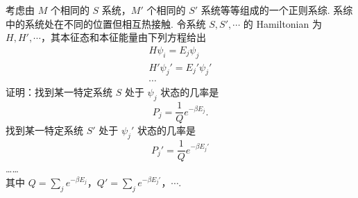 \documentclass{assignment}
\begin{document}
\begin{prob}
    考虑由 $M$ 个相同的 $S$ 系统，$M'$ 个相同的 $S'$ 系统等等组成的一个正则系综. 系综中的系统处在不同的位置但相互热接触. 令系统 $S,S',\cdots$ 的 Hamiltonian 为 $H,H',\cdots$，其本征态和本征能量由下列方程给出
    \begin{gather*}
        H\psi_i=E_j\psi_j\\
        H'\psi_j'=E_j'\psi_j'\\
        \cdots
    \end{gather*}
    证明：找到某一特定系统 $S$ 处于 $\psi_j$ 状态的几率是
    \[
        P_j=\frac{1}{Q}e^{-\beta E_j}.
    \]
    找到某一特定系统 $S'$ 处于 $\psi_j'$ 状态的几率是
    \[
        P_j'=\frac{1}{Q}e^{-\beta E_j'}
    \]
    ……\\
    其中 $Q=\sum_je^{-\beta E_j}$，$Q'=\sum_je^{-\beta E_j'}$，$\cdots$.
\end{prob}
\end{document}
